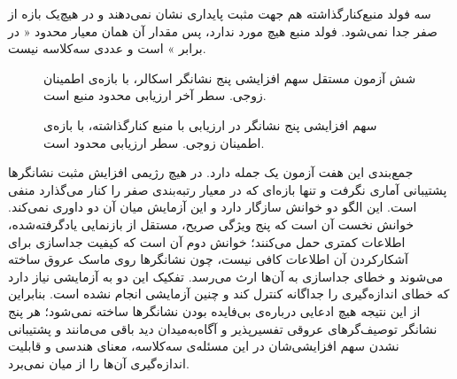 سه فولد منبع‌کنارگذاشته هم جهت مثبت پایداری نشان نمی‌دهند و در هیچ‌یک بازه از صفر جدا نمی‌شود. فولد منبع  هیچ مورد  ندارد، پس مقدار آن همان معیار محدود « در برابر » است و عددی سه‌کلاسه نیست.

\begin{figure}[htbp]
  \centering
  \caption{شش آزمون مستقل سهم افزایشی پنج نشانگر اسکالر، با بازه‌ی اطمینان زوجی. سطر آخر ارزیابی محدود منبع  است.}
  \label{fig:U19}
\end{figure}

\begin{figure}[htbp]
  \centering
  \caption{سهم افزایشی پنج نشانگر در ارزیابی با منبع کنارگذاشته، با بازه‌ی اطمینان زوجی. سطر  ارزیابی محدود است.}
  \label{fig:U20}
\end{figure}




جمع‌بندی این هفت آزمون یک جمله دارد. در هیچ رژیمی افزایش مثبت نشانگرها پشتیبانی آماری نگرفت و تنها بازه‌ای که در معیار رتبه‌بندی صفر را کنار می‌گذارد منفی است. این الگو دو خوانش سازگار دارد و این آزمایش میان آن دو داوری نمی‌کند. خوانش نخست آن است که پنج ویژگی صریح، مستقل از بازنمایی یادگرفته‌شده، اطلاعات کمتری حمل می‌کنند؛ خوانش دوم آن است که کیفیت جداسازی برای آشکارکردن آن اطلاعات کافی نیست، چون نشانگرها روی ماسک عروق ساخته می‌شوند و خطای جداسازی به آن‌ها ارث می‌رسد. تفکیک این دو به آزمایشی نیاز دارد که خطای اندازه‌گیری را جداگانه کنترل کند و چنین آزمایشی انجام نشده است. بنابراین از این نتیجه هیچ ادعایی درباره‌ی بی‌فایده بودن نشانگرها ساخته نمی‌شود؛ هر پنج نشانگر توصیف‌گرهای عروقی تفسیرپذیر و آگاه‌به‌میدان دید باقی می‌مانند و پشتیبانی نشدن سهم افزایشی‌شان در این مسئله‌ی سه‌کلاسه، معنای هندسی و قابلیت اندازه‌گیری آن‌ها را از میان نمی‌برد.
